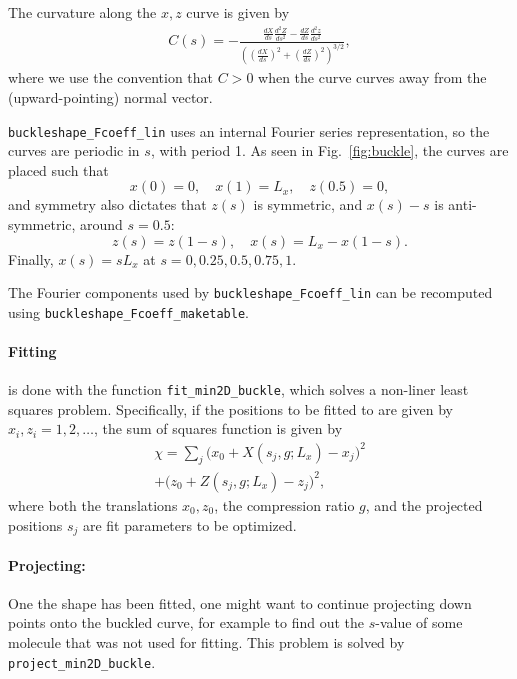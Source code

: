 \documentclass[11pt,a4paper,twocolumn]{article}
\begin{document}
The curvature along the $x,z$ curve is given by
\begin{multline}
  C(s)=-\frac{\frac{dX}{ds}\frac{d^2Z}{ds^2}-\frac{dZ}{ds}\frac{d^2z}{ds^2}}{
    \left(
    \left(\frac{dX}{ds}\right)^2+\left(\frac{dZ}{ds}\right)^2
    \right)^{3/2}},
\end{multline}
where we use the convention that $C>0$ when the curve curves away from
the (upward-pointing) normal vector.

\texttt{buckleshape\_Fcoeff\_lin} uses an internal Fourier series
representation, so the curves are periodic in $s$, with period 1. As
seen in Fig.~\ref{fig:buckle}, the curves are placed such that
\begin{equation}
x(0)=0,\quad
x(1)=L_x,\quad 
z(0.5)=0,
\end{equation}
and symmetry also dictates that $z(s)$ is symmetric, 
and $x(s)-s$ is anti-symmetric,  around $s=0.5$:
\begin{equation}
  z(s)=z(1-s),\quad
  x(s)=L_x-x(1-s).
\end{equation}
Finally, $x(s)=sL_x$ at $s=0,0.25,0.5,0.75,1$.

The Fourier components used by \texttt{buckleshape\_Fcoeff\_lin} can
be recomputed using \texttt{buckleshape\_Fcoeff\_maketable}.

\paragraph{Fitting}
is done with the function \texttt{fit\_min2D\_buckle}, which solves a
non-liner least squares problem. Specifically, if the positions to be
fitted to are given by $x_i,z_i=1,2,\ldots$, the sum of squares
function is given by
\begin{multline}
    \chi=\sum_j
    \big(x_0+X(s_j,g;L_x)-x_j\big)^2\\
   +\big(z_0+Z(s_j,g;L_x)-z_j\big)^2,
\end{multline}
where both the translations $x_0,z_0$, the compression ratio $g$, and
the projected positions $s_j$ are fit parameters to be optimized.
\paragraph{Projecting:}
One the shape has been fitted, one might want to continue projecting
down points onto the buckled curve, for example to find out the
$s$-value of some molecule that was not used for fitting. This problem
is solved by \texttt{project\_min2D\_buckle}.

 

\end{document}
